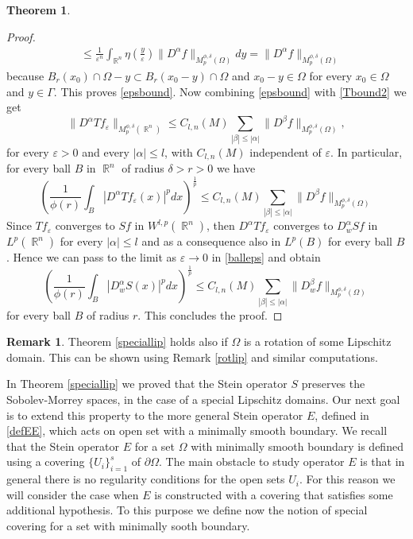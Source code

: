 \documentclass[12pt]{article}
\theoremstyle{definition}
\newtheorem{remark}{Remark}
\newtheorem{theorem}{Theorem}
\DeclareMathOperator\rr{\mathbb{R}}
\begin{document}
\begin{theorem}
\begin{proof}
\begin{align*}
 & \le \frac{1}{\varepsilon^n}  \int_{\rr^n} \eta\left(\frac{y}{\varepsilon} \right) \| D^\alpha f\|_{M_p^{\phi,\delta}(\Omega)} dy=\| D^\alpha f\|_{M_p^{\phi,\delta}(\Omega)}
\end{align*}
because $B_r(x_0)\cap \Omega -y \subset B_r(x_0-y)\cap \Omega$ and $x_0-y \in \Omega$ for every $x_0 \in \Omega$ and $y \in \Gamma.$ This proves \eqref{epsbound}. Now combining \eqref{epsbound} with \eqref{Tbound2} we get 
\[ \| D^\alpha Tf_\varepsilon\|_{M_p^{\phi,\delta}(\rr^n)}\le C_{l,n}(M)\sum_{|\beta|\le |\alpha|}\|D^\beta f \|_{M_p^{\phi,\delta}(\Omega)}, \]
for every $\varepsilon>0$ and every $|\alpha|\le l$, with $C_{l,n}(M)$ independent of $\varepsilon$. In particular, for every ball $B$ in $\rr^n$ of radius $\delta>r>0$ we have
\begin{equation}
\left( \frac{1}{\phi(r)}\int_B |D^\alpha Tf_\varepsilon(x)|^p dx \right)^\frac{1}{p} \le C_{l,n}(M)\sum_{|\beta|\le |\alpha|}\|D^\beta f \|_{M_p^{\phi,\delta}(\Omega)} \label{balleps}
\end{equation}
Since $ Tf_\varepsilon$ converges to $Sf$ in $W^{l,p}(\rr^n)$, then  $D^\alpha Tf_\varepsilon$ converges to $D^\alpha_w Sf$ in $L^p(\rr^n)$ for every $|\alpha|\le l$ and as a consequence also in $L^p(B)$ for every ball $B$. Hence we can pass to the limit as $\varepsilon \to 0$ in \eqref{balleps} and obtain
\[\left( \frac{1}{\phi(r)}\int_B |D^\alpha_w S(x)|^p dx \right)^\frac{1}{p} \le C_{l,n}(M)\sum_{|\beta|\le |\alpha|}\|D^\beta_w f \|_{M_p^{\phi,\delta}(\Omega)} \]
for every ball $B$ of radius $r.$ This concludes the proof.
 \end{proof} 
\end{theorem}

\begin{remark}
Theorem \ref{speciallip} holds also if $\Omega$ is a rotation of some Lipschitz domain. This can be shown using Remark \ref{rotlip} and similar computations.
\end{remark}
In Theorem \ref{speciallip} we proved that the Stein operator $S$ preserves the Sobolev-Morrey spaces, in the case of a special Lipschitz domains. Our next goal is to extend this property to the more general Stein operator $E$, defined in \eqref{defEE}, which acts on open set with a minimally smooth boundary. We recall that the Stein operator $E$ for a set $\Omega$ with minimally smooth boundary is defined using a covering $\{ U_i\}_{i=1}^s$ of $\partial \Omega$. The main obstacle to study operator $E$ is that in general there is no regularity conditions for the open sets $U_i$. For this reason we will consider the case when $E$ is constructed with a covering that satisfies some additional hypothesis. To this purpose we define now the notion of special covering for a set with minimally sooth boundary.
\end{document}
